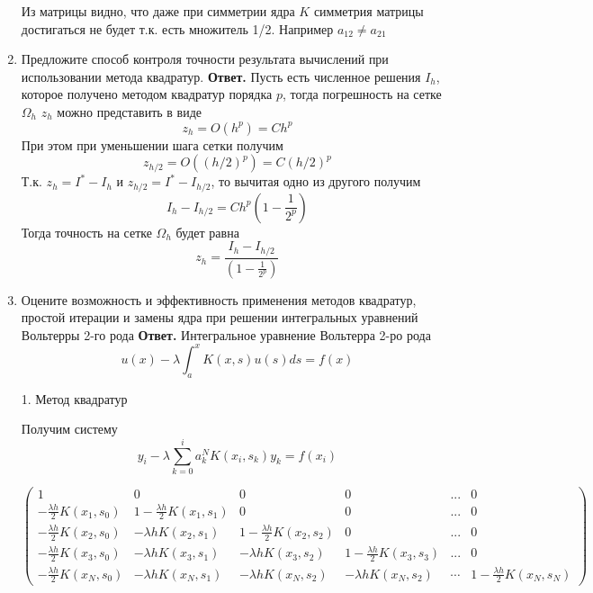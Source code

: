 \documentclass{article}
\begin{document}
\begin{enumerate}
	Из матрицы видно, что даже при симметрии ядра $K$ симметрия матрицы достигаться не будет т.к. есть множитель 1/2. Например $a_12 \neq a_21$
		\item Предложите способ контроля точности результата вычислений при использовании метода квадратур.
		\newline
		{\bfseries Ответ. } 
		Пусть есть численное решения $I_h$, которое получено методом квадратур
		порядка $p$, 
		тогда погрешность на сетке $\Omega_h$ $z_h$ можно представить в виде
		\begin{equation*}
			z_h = O(h^p) = C h^p
		\end{equation*}  
		При этом при уменьшении шага сетки получим 
		\begin{equation*}
			z_{h/2} = O((h/2)^p) = C (h/2)^p 
		\end{equation*}
		Т.к. $z_h = I^* - I_h$ и $z_{h/2} = I^* - I_{h/2}$, 
		то вычитая одно из другого получим 
		\begin{equation*}
			I_h - I_{h/2} = C h^p (1 - \frac{1}{2^p})
		\end{equation*}
		Тогда точность на сетке $\Omega_h$ будет 
		равна 
		\begin{equation*}
			z_h = \frac{I_h - I_{h/2}}{(1 - \frac{1}{2^p})}
		\end{equation*}
		\item Оцените возможность и эффективность применения методов квадратур, простой итерации и замены ядра при
		решении интегральных уравнений Вольтерры 2-го рода
		\newline
		{\bfseries Ответ. } 
		Интегральное уравнение Вольтерра 2-ро рода
	\[
	u(x) - \lambda \int_{a}^{x} K(x,s)u(s)ds = f(x)
	\]
	
	
	1. Метод квадратур
	
	
	Получим систему 
	\[
	y_i - \lambda \sum_{k=0}^{i} a_k^N K(x_i, s_k) y_k = f(x_i)
	\]
	
	\[
	\begin{pmatrix}
		1 & 0 &0 & 0 & ... & 0 \\
		-\frac{\lambda h}{2} K(x_1, s_0) & 1 - \frac{\lambda h}{2} K(x_1, s_1) & 0 & 0 & ... & 0\\
		-\frac{\lambda h}{2} K(x_2, s_0) & -\lambda h K(x_2, s_1) & 1-\frac{\lambda h}{2} K(x_2, s_2) &0 & ... & 0 \\
		-\frac{\lambda h}{2} K(x_3, s_0) & -\lambda h K(x_3, s_1) & -\lambda h K(x_3, s_2) & 1 - \frac{\lambda h}{2} K(x_3, s_3) & ... & 0\\
		-\frac{\lambda h}{2} K(x_N, s_0) & -\lambda h K(x_N, s_1) & -\lambda h K(x_N, s_2) & -\lambda h K(x_N, s_2)&\cdots & 1-\frac{\lambda h}{2} K(x_N, s_N) 
	\end{pmatrix}
	\]
	

\end{enumerate}
\end{document}

